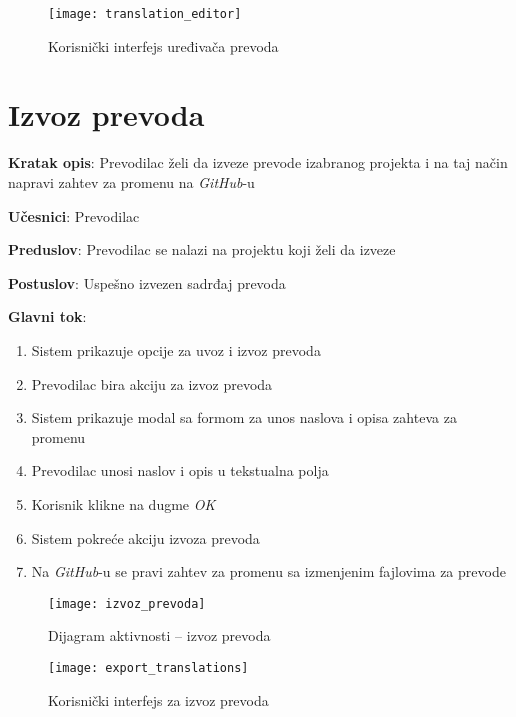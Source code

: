 \begin{figure}[H]
    \centering
    \texttt{[image: translation\_editor]}
    \caption{Korisnički interfejs uređivača prevoda}
\end{figure}


\section{Izvoz prevoda}

\textbf{Kratak opis}: Prevodilac želi da izveze prevode izabranog projekta i 
na taj način napravi zahtev za promenu na \textit{GitHub}-u

\textbf{Učesnici}: Prevodilac

\textbf{Preduslov}: Prevodilac se nalazi na projektu koji želi da izveze

\textbf{Postuslov}: Uspešno izvezen sadrđaj prevoda

\textbf{Glavni tok}:
\begin{enumerate}
    \item Sistem prikazuje opcije za uvoz i izvoz prevoda
    \item Prevodilac bira akciju za izvoz prevoda
    \item Sistem prikazuje modal sa formom za unos naslova i opisa 
    zahteva za promenu
    \item Prevodilac unosi naslov i opis u tekstualna polja
    \item Korisnik klikne na dugme \textit{OK}
    \item Sistem pokreće akciju izvoza prevoda
    \item Na \textit{GitHub}-u se pravi zahtev za promenu sa izmenjenim fajlovima za prevode
\end{enumerate}

\begin{figure}[H]
    \centering
    \texttt{[image: izvoz\_prevoda]}
    \caption{Dijagram aktivnosti -- izvoz prevoda}
\end{figure}

\begin{figure}[H]
    \centering
    \texttt{[image: export\_translations]}
    \caption{Korisnički interfejs za izvoz prevoda}
\end{figure}

